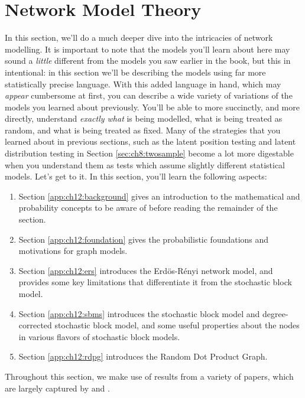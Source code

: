\chapter{Network Model Theory}
\label{app:ch12}

In this section, we'll do a much deeper dive into the intricacies of network modelling. It is important to note that the models you'll learn about here may sound a \textit{little} different from the models you saw earlier in the book, but this in intentional: in this section we'll be describing the models using far more statistically precise language. With this added language in hand, which may \textit{appear} cumbersome at first, you can describe a wide variety of variations of the models you learned about previously. You'll be able to more succinctly, and more directly, understand \textit{exactly what} is being modelled, what is being treated as random, and what is being treated as fixed. Many of the strategies that you learned about in previous sections, such as the latent position testing and latent distribution testing in Section \ref{sec:ch8:twosample} become a lot more digestable when you understand them as tests which assume slightly different statistical models. Let's get to it. In this section, you'll learn the following aspects:

\begin{enumerate}
    \item Section \ref{app:ch12:background} gives an introduction to the mathematical and probability concepts to be aware of before reading the remainder of the section.
    \item Section \ref{app:ch12:foundation} gives the probabilistic foundations and motivations for graph models.
    \item Section \ref{app:ch12:ers} introduces the Erd\"os-R\'enyi network model, and provides some key limitations that differentiate it from the stochastic block model.
    \item Section \ref{app:ch12:sbms} introduces the stochastic block model and degree-corrected stochastic block model, and some useful properties about the nodes in various flavors of stochastic block models.
    \item Section \ref{app:ch12:rdpg} introduces the Random Dot Product Graph.
\end{enumerate}

Throughout this section, we make use of results from a variety of papers, which are largely captured by \cite{Athreya2017Jan} and \cite{Chung2021Mar}.








